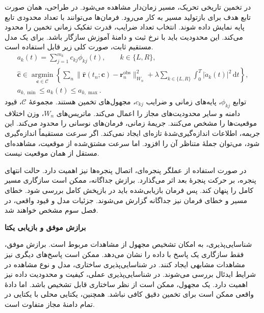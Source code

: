 در تخمین تاریخی تحریک، مسیر زمان‌دار مشاهده می‌شود.
در طراحی، همان صورت تابع هدف برای بازتولید مسیر به کار می‌رود.
فرمان‌ها می‌توانند با تعداد محدودی تابع پایه نمایش داده شوند.
انتخاب تعداد ضرایب، قدرت تفکیک زمانی تخمین را محدود می‌کند.
این محدودیت باید با نرخ ثبت و دامنهٔ آموزش سازگار باشد.
برای یک مدل مستقیم ثابت، صورت کلی زیر قابل استفاده است.
\begin{equation}
\begin{gathered}
a_k(t)=\sum_{j=1}^{m_k}c_{kj}\phi_{kj}(t),
\qquad k\in\{L,R\},\\
\widehat{\mathbf c}\in
\underset{\mathbf c\in\mathcal C}{\operatorname{argmin}}
\left\{
\sum_n\|\widehat{\mathbf r}(t_n;\mathbf c)
-\mathbf r_n^{\mathrm{obs}}\|_{W_n}^2
+\lambda\sum_{k\in\{L,R\}}\int_0^T|\dot a_k(t)|^2\,\mathrm dt
\right\},\\
a_{k,\min}\le a_k(t)\le a_{k,\max}.
\end{gathered}
\label{eq:lit-magnetic-input-estimation}
\end{equation}
توابع $\phi_{kj}$، پایه‌های زمانی و ضرایب $c_{kj}$، مجهول‌های تخمین هستند.
مجموعهٔ $\mathcal C$، قیود دامنه و سایر محدودیت‌های مجاز را اعمال می‌کند.
ماتریس‌های $W_n$، وزن اختلاف موقعیت‌ها را مشخص می‌کنند.
جریمهٔ زمانی، فرمان‌های نوسانی را محدود می‌کند.
این جریمه، اطلاعات اندازه‌گیری‌شدهٔ تازه‌ای ایجاد نمی‌کند.
اگر سرعت مستقیماً اندازه‌گیری شود، می‌توان جملهٔ متناظر آن را افزود.
اما سرعت مشتق‌شده از موقعیت، مشاهده‌ای مستقل از همان موقعیت نیست.

در صورت استفاده از عملگر پنجره‌ای، اتصال پنجره‌ها نیز اهمیت دارد.
حالت انتهای پنجره، بر حرکت پنجرهٔ بعد اثر می‌گذارد.
برازش جداگانه، ممکن است سازگاری مسیر کامل را پنهان کند.
پس فرمان بازیابی‌شده باید در بازپخش کامل بررسی شود.
خطای مسیر و خطای فرمان نیز جداگانه گزارش می‌شوند.
جزئیات مدل و قیود واقعی، در فصل سوم مشخص خواهند شد.

\label{sec:lit-identifiability-noise-validation}

\textbf{برازش موفق و بازیابی یکتا}

شناسایی‌پذیری، به امکان تشخیص مجهول از مشاهدات مربوط است.
برازش موفق، فقط سازگاری یک پاسخ با داده را نشان می‌دهد.
ممکن است پاسخ‌های دیگری نیز مشاهدات مشابهی ایجاد کنند.
در شناسایی‌پذیری ساختاری، مدل و نوع مشاهده در شرایط ایدئال بررسی می‌شوند.
در شناسایی‌پذیری عملی، کیفیت و محدودیت داده نیز اهمیت دارد.
یک مجهول، ممکن است از نظر ساختاری قابل تشخیص باشد.
اما دادهٔ واقعی ممکن است برای تخمین دقیق کافی نباشد.
همچنین، یکتایی محلی با یکتایی در تمام دامنهٔ مجاز متفاوت است.

